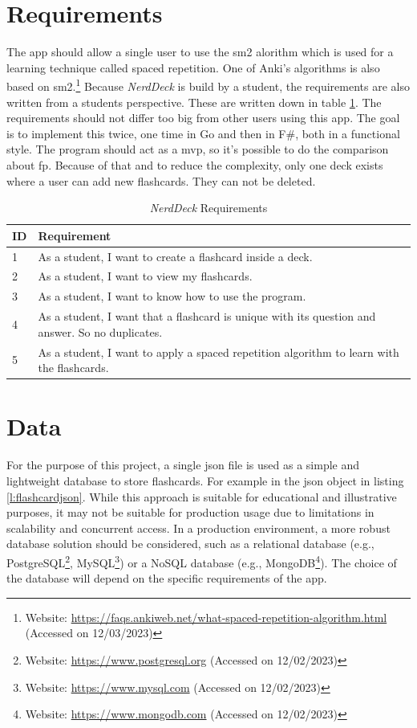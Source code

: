     \section{Requirements}
     The \ac{app} should allow a single user to use the \ac{sm2} alorithm which is used for a learning technique called spaced repetition.\cite{sm2} One of Anki's algorithms is also based on \ac{sm2}.\footnote{Website: \url{https://faqs.ankiweb.net/what-spaced-repetition-algorithm.html} (Accessed on 12/03/2023)} Because \textit{NerdDeck} is build by a student, the requirements are also written from a students perspective. These are written down in table \ref{tab:requirements}. The requirements should not differ too big from other users using this \ac{app}. The goal is to implement this twice, one time in Go and then in F\#, both in a functional style. The program should act as a \ac{mvp}, so it's possible to do the comparison about \ac{fp}. Because of that and to reduce the complexity, only one deck exists where a user can add new flashcards. They can not be deleted.
    \begin{table}[h]
        \centering
        \begin{tabular}{|m{0.5in}|m{4in}|}
            \hline
            \textbf{ID} & \textbf{Requirement} \\
            \hline
            1 & As a student, I want to create a flashcard inside a deck. \\
            \hline
            2 & As a student, I want to view my flashcards. \\
            \hline
            3 & As a student, I want to know how to use the program. \\
            \hline
            4 & As a student, I want that a flashcard is unique with its question and answer. So no duplicates.  \\
            \hline
            5 & As a student, I want to apply a spaced repetition algorithm to learn with the flashcards. \\
            \hline
        \end{tabular}
        \caption{\textit{NerdDeck} Requirements}\label{tab:requirements}
    \end{table}

    \section{Data}
    For the purpose of this project, a single \ac{json} file is used as a simple and lightweight database to store flashcards. For example in the \ac{json} object in listing \ref{l:flashcardjson}. While this approach is suitable for educational and illustrative purposes, it may not be suitable for production usage due to limitations in scalability and concurrent access. In a production environment, a more robust database solution should be considered, such as a relational database (e.g., PostgreSQL\footnote{Website: \url{https://www.postgresql.org} (Accessed on 12/02/2023)}, MySQL\footnote{Website: \url{https://www.mysql.com} (Accessed on 12/02/2023)}) or a NoSQL database (e.g., MongoDB\footnote{Website: \url{https://www.mongodb.com} (Accessed on 12/02/2023)}). The choice of the database will depend on the specific requirements of the \ac{app}.

